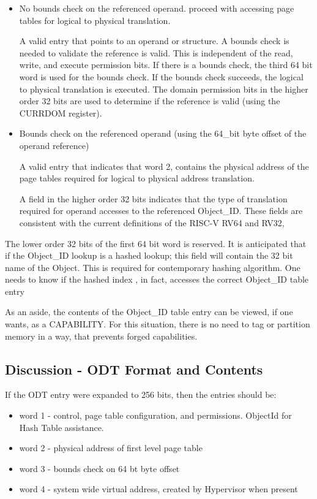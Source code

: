 \documentclass{article}
\begin{document}
\begin{itemize}
\item No bounds check on the referenced operand.  proceed with  accessing page tables for logical to physical translation.

A valid entry that points to an operand or structure.  A bounds check is needed to validate the reference is valid.  This is independent of the read, write, and execute permission bits. If there is a bounds check,  the third 64 bit word is used for the bounds check. If the bounds check succeeds,  the  logical to physical translation is executed. The domain permission bits in the higher order 32 bits are used to determine if the reference is valid (using the CURRDOM register).

\item Bounds check on the referenced operand (using the 64\_bit byte offset of the operand reference)

A   valid entry that  indicates that word 2, contains the physical address of the page tables required for logical  to physical address translation.

A field in the higher order 32 bits indicates that the type of   translation required for operand accesses to the referenced Object\_ID. These fields are  consistent with the current definitions of the RISC-V  RV64 and RV32,

\end{itemize}
The lower order 32 bits of the first 64 bit word is reserved.  It is anticipated that if the Object\_ID lookup is a hashed lookup;  this field will contain the 32 bit name of the Object.  This is required for contemporary  hashing algorithm.  One needs to know if the hashed  index , in fact, accesses the correct Object\_ID table entry

As an aside,  the contents of the Object\_ID table entry can be viewed, if one wants, as a CAPABILITY.  For this situation,  there is no need to tag or partition memory in a way, that prevents forged capabilities.

\subsection{Discussion - ODT Format and Contents}
\label{Discussion - ODT Format and Contents}

If the ODT entry were expanded to 256 bits,  then the entries should be:

\begin{itemize}

\item word 1  - control,  page table configuration,  and permissions.  ObjectId for Hash Table assistance.
\item word 2 - physical address of first level page table
\item word 3 - bounds check  on 64 bt byte offset 
\item word 4 - system wide virtual address,  created by Hypervisor when present
\end{itemize}
\end{document}
